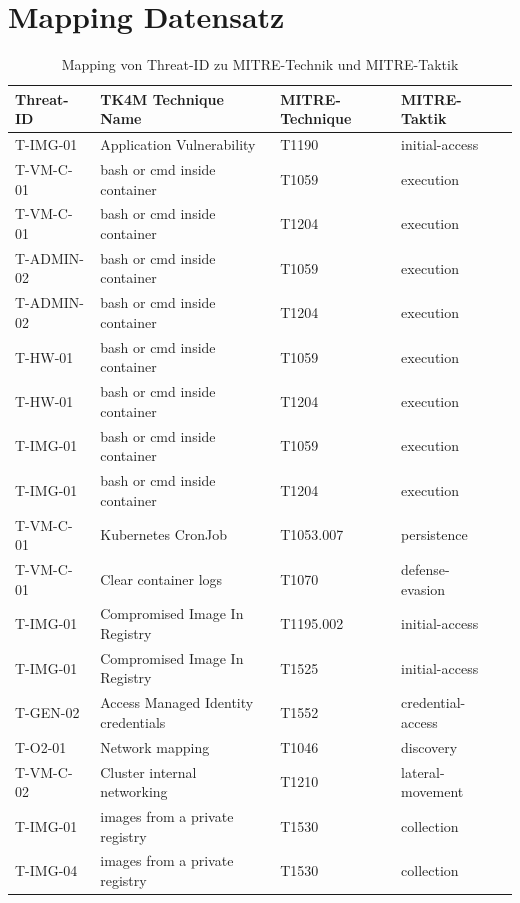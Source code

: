 \chapter{Mapping Datensatz}
\label{app:mapping-dataset}
\begin{longtable}{|l|l|l|l|l|}
    \caption{Mapping von Threat-ID zu MITRE-Technik und MITRE-Taktik}\\
    \hline
    Threat-ID & TK4M Technique Name & MITRE-Technique & MITRE-Taktik \\ \hline
T-IMG-01 & Application Vulnerability & T1190 & initial-access \\ \hline
T-VM-C-01 & bash or cmd inside container & T1059 & execution \\ \hline
T-VM-C-01 & bash or cmd inside container & T1204 & execution \\ \hline
T-ADMIN-02 & bash or cmd inside container & T1059 & execution \\ \hline
T-ADMIN-02 & bash or cmd inside container & T1204 & execution \\ \hline
T-HW-01 & bash or cmd inside container & T1059 & execution \\ \hline
T-HW-01 & bash or cmd inside container & T1204 & execution \\ \hline
T-IMG-01 & bash or cmd inside container & T1059 & execution \\ \hline
T-IMG-01 & bash or cmd inside container & T1204 & execution \\ \hline
T-VM-C-01 & Kubernetes CronJob & T1053.007 & persistence \\ \hline
T-VM-C-01 & Clear container logs & T1070 & defense-evasion \\ \hline
T-IMG-01 & Compromised Image In Registry & T1195.002 & initial-access \\ \hline
T-IMG-01 & Compromised Image In Registry & T1525 & initial-access \\ \hline
T-GEN-02 & Access Managed Identity credentials & T1552 & credential-access \\ \hline
T-O2-01 & Network mapping & T1046 & discovery \\ \hline
T-VM-C-02 & Cluster internal networking & T1210 & lateral-movement \\ \hline
T-IMG-01 & images from a private registry & T1530 & collection \\ \hline
T-IMG-04 & images from a private registry & T1530 & collection \\ \hline

\end{longtable}
